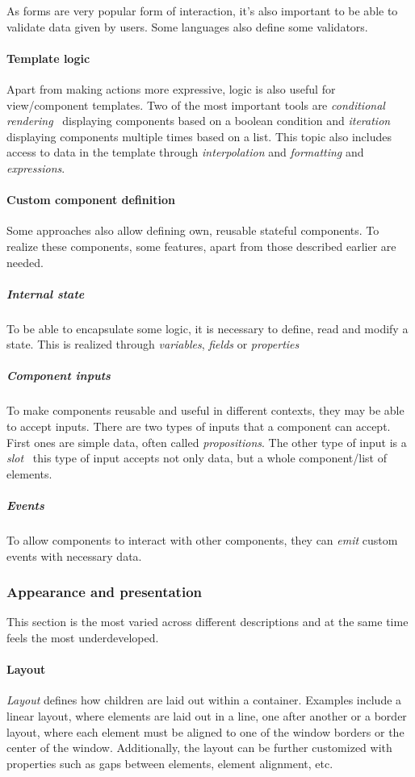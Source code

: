 As forms are very popular form of interaction, it's also important to be able to validate data given by users.
Some languages also define some validators.

\paragraph{Template logic}
Apart from making actions more expressive, logic is also useful for view/component templates.
Two of the most important tools are \emph{conditional rendering} \textendash\ displaying components based on a boolean condition and \emph{iteration} displaying components multiple times based on a list.
This topic also includes access to data in the template through \emph{interpolation} and \emph{formatting} and \emph{expressions}.

\paragraph{Custom component definition}
Some approaches also allow defining own, reusable stateful components.
To realize these components, some features, apart from those described earlier are needed.

\subparagraph{Internal state}
To be able to encapsulate some logic, it is necessary to define, read and modify a state.
This is realized through \emph{variables}, \emph{fields} or \emph{properties}

\subparagraph{Component inputs}
To make components reusable and useful in different contexts, they may be able to accept inputs.
There are two types of inputs that a component can accept.
 First ones are simple data, often called \emph{propositions}.
The other type of input is a \emph{slot} \textendash\ this type of input accepts not only data, but a whole component/list of elements.

\subparagraph{Events}
To allow components to interact with other components, they can \emph{emit} custom events with necessary data.

\subsubsection{Appearance and presentation}
This section is the most varied across different descriptions and at the same time feels the most underdeveloped.

\paragraph{Layout}
\emph{Layout} defines how children are laid out within a container.
 Examples include a linear layout, where elements are laid out in a line, one after another or a border layout, where each element must be aligned to one of the window borders or the center of the window.
Additionally, the layout can be further customized with properties such as gaps between elements, element alignment, etc.

